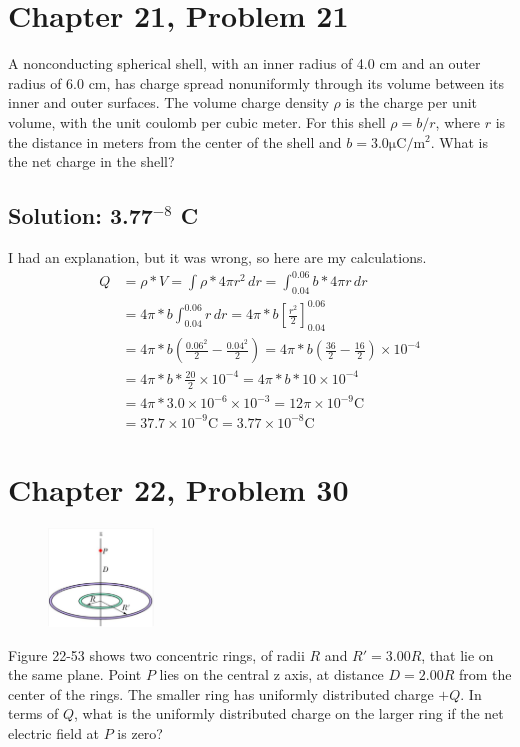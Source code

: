 \documentclass[12pt]{article}
\begin{document}
\pagebreak
\section{Chapter 21, Problem 21}
A nonconducting spherical shell, with an inner radius of 4.0 cm and an outer radius of 6.0 cm, has charge spread nonuniformly through its volume between its inner and outer surfaces. The volume charge density $\rho$ is the charge per unit volume, with the unit coulomb per cubic meter. For this shell $\rho = b/r$, where $r$ is the distance in meters from the center of the shell and $b = 3.0 \unit{\micro\coulomb/\meter^2}$. What is the net charge in the shell?

\subsection*{Solution: 3.77$^{-8}$ C}
I had an explanation, but it was wrong, so here are my calculations. 
\begin{align*}
    Q   &=  \rho*V
        =   \int \rho * 4 \pi r^2\,dr
        =   \int_{0.04}^{0.06} b * 4 \pi r\,dr\\
        &=  4\pi * b \int_{0.04}^{0.06} r\,dr
        =   4\pi * b \left[\frac{r^2}{2}\right]_{0.04}^{0.06}\\
        &=  4\pi * b \left(\frac{0.06^2}{2} - \frac{0.04^2}{2}\right)
        =   4\pi * b \left(\frac{36}{2} - \frac{16}{2}\right) \times 10^{-4}\\
        &=  4\pi * b * \frac{20}{2} \times 10^{-4}
        =   4\pi * b * 10 \times 10^{-4}\\
        &=  4\pi * 3.0 \times 10^{-6} \times 10^{-3}
        =   12\pi \times 10^{-9} \unit{\coulomb}\\
        &=  \boxed{37.7 \times 10^{-9} \unit{\coulomb}  = 3.77 \times 10^{-8} \unit{\coulomb}}
\end{align*}

\pagebreak
\section{Chapter 22, Problem 30}
\begin{figure}
    \vspace{-30pt}
    \includegraphics[width=0.25\textwidth]{picture_3.png} 
\end{figure}
Figure 22-53 shows two concentric rings, of radii $R$ and $R' = 3.00R$, that lie on the same plane. Point $P$ lies on the central z axis, at distance $D = 2.00R$ from the center of the rings. The smaller ring has uniformly distributed charge $+Q$. In terms of $Q$, what is the uniformly distributed charge on the larger ring if the net electric field at $P$ is zero?
\end{document}
